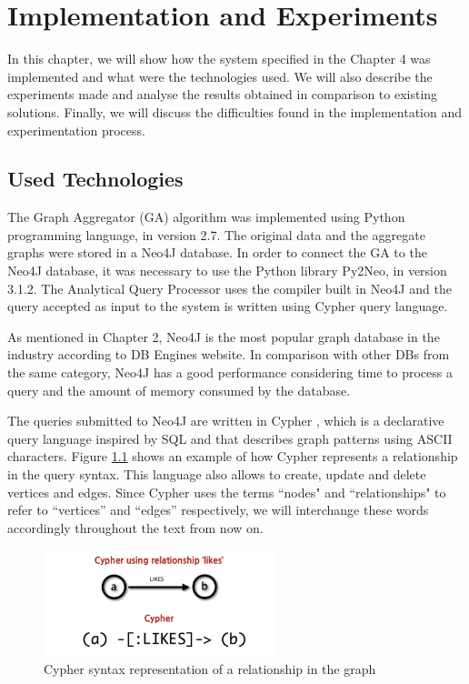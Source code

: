 \chapter{Implementation and Experiments}

In this chapter, we will show how the system specified in the Chapter 4 was implemented and what were the technologies used. We will also describe the experiments made and analyse the results obtained in comparison to existing solutions. Finally, we will discuss the difficulties found in the implementation and experimentation process.

\section{Used Technologies}
The Graph Aggregator (GA) algorithm was implemented using Python programming language, in version 2.7. The original data and the aggregate graphs were stored in a Neo4J database. In order to connect the GA to the Neo4J database, it was necessary to use the Python library Py2Neo, in version 3.1.2. The Analytical Query Processor uses the compiler built in Neo4J and the query accepted as input to the system is written using Cypher query language.

As mentioned in Chapter 2, Neo4J is the most popular graph database in the industry according to DB Engines website. In comparison with other DBs from the same category, Neo4J has a good performance considering time to process a query and the amount of memory consumed by the database.

The queries submitted to Neo4J are written in Cypher \cite{Neo4jCypher}, which is a declarative query language inspired by SQL and that describes graph patterns using ASCII characters. Figure \ref{fig:figure29} shows an example of how Cypher represents a relationship in the query syntax. This language also allows to create, update and delete vertices and edges. Since Cypher uses the terms ``nodes" and ``relationships" to refer to ``vertices'' and ``edges'' respectively, we will interchange these words accordingly throughout the text from now on.

\begin{figure}[ht]
\centering
\includegraphics[width=0.6\textwidth]{../cypher_pattern_simple.png}
\caption{Cypher syntax representation of a relationship in the graph \cite{Neo4jCypher}}
\label{fig:figure29}
\end{figure}

